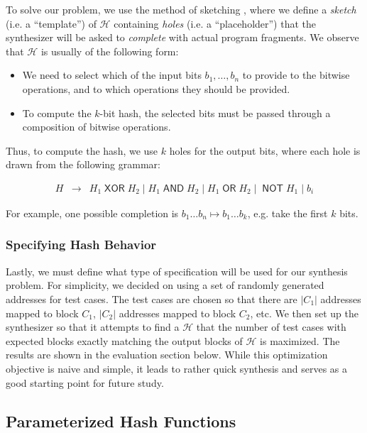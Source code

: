 To solve our problem, we use the method of sketching
\cite{solar-lezama-sketching}, where we define a \textit{sketch} (i.e. a
``template'') of $\mathcal{H}$ containing \textit{holes} (i.e. a
``placeholder'') that the synthesizer will be asked to \textit{complete} with
actual program fragments. We observe that $\mathcal{H}$ is usually of the
following form:
\begin{itemize}
\item We need to select which of the input bits $b_1, \dots, b_n$ to provide to
  the bitwise operations, and to which operations they should be provided.
\item To compute the $k$-bit hash, the selected bits must be passed through a
  composition of bitwise operations.
\end{itemize}
Thus, to compute the hash, we use $k$ holes for the output bits, where each hole
is drawn from the following grammar:

\newcommand{\bop}[1]{\mathop{\mathsf{#1}}}
\[
\begin{array}{rcl}
  H &\to& H_1 \bop{XOR} H_2 \mid H_1 \bop{AND} H_2 \mid H_1 \bop{OR} H_2
          \mid \bop{NOT} H_1 \mid b_i
\end{array}
\]

For example, one possible completion is $b_1 \dots b_n \mapsto b_1\dots b_k$,
e.g. take the first $k$ bits.

\subsubsection{Specifying Hash Behavior}

Lastly, we must define what type of specification will be used for our synthesis
problem. For simplicity, we decided on using a set of randomly generated
addresses for test cases. The test cases are chosen so that there are $|C_1|$
addresses mapped to block $C_1$, $|C_2|$ addresses mapped to block $C_2$, etc.
We then set up the synthesizer so that it attempts to find a $\mathcal{H}$ that
the number of test cases with expected blocks exactly matching the output blocks
of $\mathcal{H}$ is maximized. The results are shown in the evaluation section
below. While this optimization objective is naive and simple, it leads to rather
quick synthesis and serves as a good starting point for future study.

\subsection{Parameterized Hash Functions}


